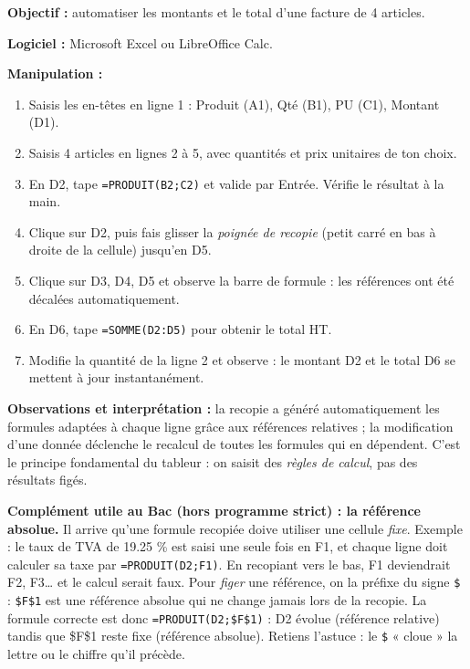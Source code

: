 \documentclass[11pt]{article}
\newcommand{\cle}[1]{{\popxbold\color{popdark}#1}}
\begin{document}
\begin{experience}
\textbf{Objectif :} automatiser les montants et le total d'une facture de 4 articles.\par
\textbf{Logiciel :} Microsoft Excel ou LibreOffice Calc.\par
\textbf{Manipulation :}
\begin{enumerate}
\item Saisis les en-têtes en ligne 1 : Produit (A1), Qté (B1), PU (C1), Montant (D1).
\item Saisis 4 articles en lignes 2 à 5, avec quantités et prix unitaires de ton choix.
\item En D2, tape \texttt{=PRODUIT(B2;C2)} et valide par Entrée. Vérifie le résultat à la main.
\item Clique sur D2, puis fais glisser la \emph{poignée de recopie} (petit carré en bas à droite de la cellule) jusqu'en D5.
\item Clique sur D3, D4, D5 et observe la barre de formule : les références ont été décalées automatiquement.
\item En D6, tape \texttt{=SOMME(D2:D5)} pour obtenir le total HT.
\item Modifie la quantité de la ligne 2 et observe : le montant D2 et le total D6 se mettent à jour instantanément.
\end{enumerate}
\textbf{Observations et interprétation :} la recopie a généré automatiquement les formules adaptées à chaque ligne grâce aux références relatives ; la modification d'une donnée déclenche le recalcul de toutes les formules qui en dépendent. C'est le principe fondamental du tableur : on saisit des \emph{règles de calcul}, pas des résultats figés.
\end{experience}

\textbf{Complément utile au Bac (hors programme strict) : la référence absolue.} Il arrive qu'une formule recopiée doive utiliser une cellule \emph{fixe}. Exemple : le taux de TVA de \num{19,25} \% est saisi une seule fois en F1, et chaque ligne doit calculer sa taxe par \texttt{=PRODUIT(D2;F1)}. En recopiant vers le bas, F1 deviendrait F2, F3\ldots{} et le calcul serait faux. Pour \emph{figer} une référence, on la préfixe du signe \texttt{\$} : \texttt{\$F\$1} est une \cle{référence absolue} qui ne change jamais lors de la recopie. La formule correcte est donc \texttt{=PRODUIT(D2;\$F\$1)} : D2 évolue (référence relative) tandis que \$F\$1 reste fixe (référence absolue). Retiens l'astuce : le \texttt{\$} « cloue » la lettre ou le chiffre qu'il précède.
\end{document}
